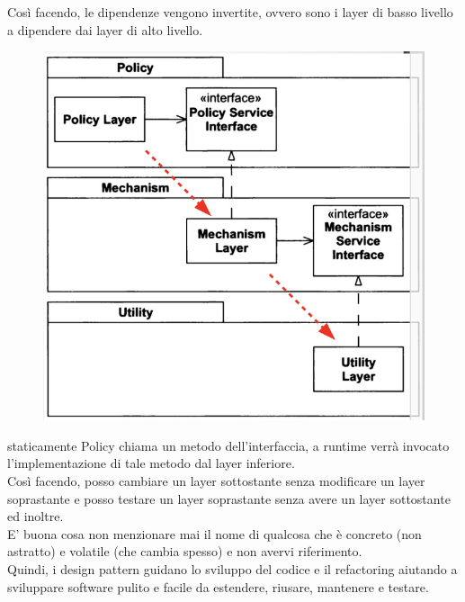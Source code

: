 Così facendo, le dipendenze vengono invertite, ovvero sono i layer di basso livello a dipendere dai layer di alto livello.\\
\begin{figure}[H]
  \centering
  \includegraphics[width=0.5\linewidth]{../../immagini/principio_SOLID/architetturaOODIP}  
\end{figure}

staticamente Policy chiama un metodo dell'interfaccia, a runtime verrà invocato l'implementazione di tale metodo dal layer inferiore.\\
Così facendo, posso cambiare un layer sottostante senza modificare un layer soprastante e posso testare un layer soprastante senza avere un layer
sottostante ed inoltre.\\
E' buona cosa non menzionare mai il nome di qualcosa che è concreto (non astratto) e volatile (che cambia spesso) e non avervi riferimento.\\

Quindi, i design pattern guidano lo sviluppo del codice e il refactoring aiutando a sviluppare software pulito e facile da estendere, riusare, mantenere e testare.